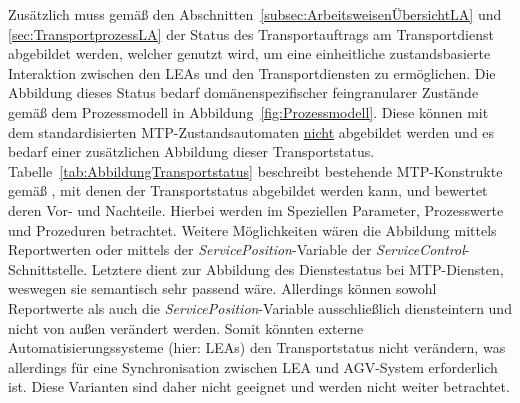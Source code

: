 Zusätzlich muss gemäß den Abschnitten~\ref{subsec:ArbeitsweisenÜbersichtLA} und \ref{sec:TransportprozessLA} der Status des Transportauftrags am Transportdienst abgebildet werden, welcher genutzt wird, um eine einheitliche zustandsbasierte Interaktion zwischen den LEAs und den Transportdiensten zu ermöglichen. Die Abbildung dieses Status bedarf domänenspezifischer feingranularer Zustände gemäß dem Prozessmodell in Abbildung~\ref{fig:Prozessmodell}. Diese können mit dem standardisierten MTP-Zustandsautomaten \underline{nicht} abgebildet werden und es bedarf einer zusätzlichen Abbildung dieser Transportstatus. Tabelle~\ref{tab:AbbildungTransportstatus} beschreibt bestehende MTP-Konstrukte gemäß \cite{PNO.2025.Part4}, mit denen der Transportstatus abgebildet werden kann, und bewertet deren Vor- und Nachteile. Hierbei werden im Speziellen Parameter, Prozesswerte und Prozeduren betrachtet. Weitere Möglichkeiten wären die Abbildung mittels Reportwerten oder mittels der \emph{ServicePosition}-Variable der \emph{ServiceControl}-Schnittstelle. Letztere dient zur Abbildung des Dienstestatus bei MTP-Diensten, weswegen sie semantisch sehr passend wäre. Allerdings können sowohl Reportwerte als auch die \emph{ServicePosition}-Variable ausschließlich diensteintern und nicht von außen verändert werden. Somit könnten externe Automatisierungssysteme (hier: LEAs) den Transportstatus nicht verändern, was allerdings für eine Synchronisation zwischen LEA und AGV-System erforderlich ist. Diese Varianten sind daher nicht geeignet und werden nicht weiter betrachtet.

